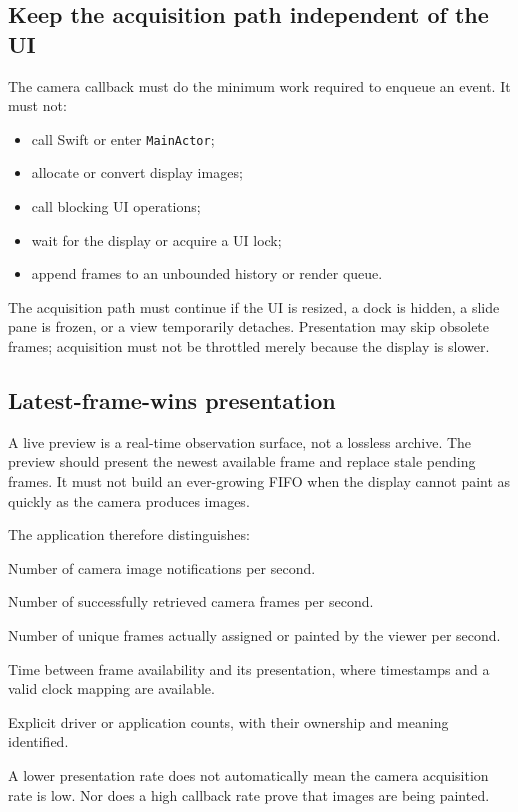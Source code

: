 \documentclass[11pt,a4paper,oneside]{article}
\newcommand{\code}[1]{\texttt{\small #1}}
\begin{document}
\subsection{Keep the acquisition path independent of the UI}
The camera callback must do the minimum work required to enqueue an event. It must not:
\begin{itemize}
  \item call Swift or enter \code{MainActor};
  \item allocate or convert display images;
  \item call blocking UI operations;
  \item wait for the display or acquire a UI lock;
  \item append frames to an unbounded history or render queue.
\end{itemize}

The acquisition path must continue if the UI is resized, a dock is hidden, a slide pane is frozen, or a view temporarily detaches. Presentation may skip obsolete frames; acquisition must not be throttled merely because the display is slower.

\subsection{Latest-frame-wins presentation}
A live preview is a real-time observation surface, not a lossless archive. The preview should present the newest available frame and replace stale pending frames. It must not build an ever-growing FIFO when the display cannot paint as quickly as the camera produces images.

The application therefore distinguishes:
\begin{description}[style=nextline]
  \item[Event rate] Number of camera image notifications per second.
  \item[Pull rate] Number of successfully retrieved camera frames per second.
  \item[Presentation rate] Number of unique frames actually assigned or painted by the viewer per second.
  \item[Frame age] Time between frame availability and its presentation, where timestamps and a valid clock mapping are available.
  \item[Drop accounting] Explicit driver or application counts, with their ownership and meaning identified.
\end{description}
A lower presentation rate does not automatically mean the camera acquisition rate is low. Nor does a high callback rate prove that images are being painted.
\end{document}

